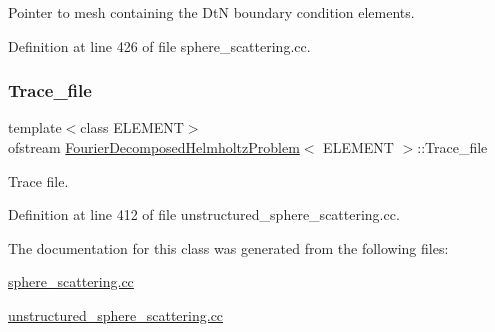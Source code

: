 Pointer to mesh containing the DtN boundary condition elements. 



Definition at line 426 of file sphere\+\_\+scattering.\+cc.

\mbox{\label{classFourierDecomposedHelmholtzProblem_ab9786130005c43637f8b305c2becc555}} 
\subsubsection{\texorpdfstring{Trace\+\_\+file}{Trace\_file}}
{\footnotesize\ttfamily template$<$class E\+L\+E\+M\+E\+NT$>$ \\
ofstream \hyperlink{classFourierDecomposedHelmholtzProblem}{Fourier\+Decomposed\+Helmholtz\+Problem}$<$ E\+L\+E\+M\+E\+NT $>$\+::Trace\+\_\+file\hspace{0.3cm}{\ttfamily [private]}}



Trace file. 



Definition at line 412 of file unstructured\+\_\+sphere\+\_\+scattering.\+cc.



The documentation for this class was generated from the following files\+:\begin{DoxyCompactItemize}
\item 
\hyperlink{sphere__scattering_8cc}{sphere\+\_\+scattering.\+cc}\item 
\hyperlink{unstructured__sphere__scattering_8cc}{unstructured\+\_\+sphere\+\_\+scattering.\+cc}\end{DoxyCompactItemize}

